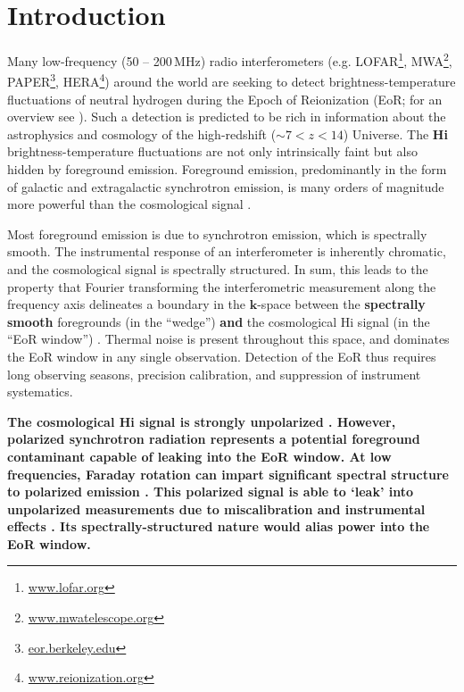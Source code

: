 \documentclass[twocolumn, trackchanges]{aastex61}
\newcommand{\edited}[1]{{\bf \color{red} #1}}
\begin{document}

\section{Introduction}
\label{sec:intro}

Many low-frequency (50 -- 200\,MHz) radio interferometers (e.g. LOFAR\footnote{\url{www.lofar.org}}, MWA\footnote{\url{www.mwatelescope.org}}, PAPER\footnote{\url{eor.berkeley.edu}}, HERA\footnote{\url{www.reionization.org}}) around the world are seeking to detect brightness-temperature fluctuations of neutral hydrogen during the Epoch of Reionization (EoR; for an overview see \citet{Furlanetto06}). 
Such a detection is predicted to be rich in information about the astrophysics and cosmology of the high-redshift ($\sim 7 < z < 14$) Universe.
The \edited{{\sc Hi}} brightness-temperature fluctuations are not only intrinsically faint but also hidden by foreground emission. Foreground emission, predominantly in the form of galactic and extragalactic synchrotron emission, is many orders of magnitude more powerful than the cosmological signal \citep[e.g.][]{Bernardi09, Pober13, Dillon14}.

Most foreground emission is due to synchrotron emission, which is spectrally smooth. The instrumental response of an interferometer is inherently chromatic, and the cosmological signal is spectrally structured. In sum, this leads to the property that Fourier transforming the interferometric measurement along the frequency axis delineates a boundary in the $\mathbf{k}$-space between the \edited{spectrally smooth}
foregrounds (in the ``wedge'') \edited{and} the cosmological {\sc Hi} signal (in the ``EoR window'')
\citep{Datta.10, Morales.12, Parsons.12a, Parsons.12b, Trott.12, Vedantham.12, Pober13, Thyagarajan.13, Pober.14, Liu.14a, Liu.14b, Dillon.15a, Dillon.15b, Nithya.15b, Nithya.15a}.
Thermal noise is present throughout this space, and dominates the EoR window in any single observation.
Detection of the EoR thus requires long observing seasons, precision calibration, and suppression of instrument systematics. 

\edited{The cosmological {\sc Hi} signal is strongly unpolarized \citep{Mishra.17}. However, polarized synchrotron radiation represents a potential foreground contaminant capable of leaking into the EoR window. At low frequencies, Faraday rotation can impart significant spectral structure to polarized emission \citep[e.g.][]{Moore13}. This polarized signal is able to `leak' into unpolarized measurements due to miscalibration and instrumental effects \citep{Carozzi.09, Geil.11, Moore13, Asad15, Asad.16, Kohn16, Nunhokee.17}. Its spectrally-structured nature would alias power into the EoR window.} 
\end{document}
